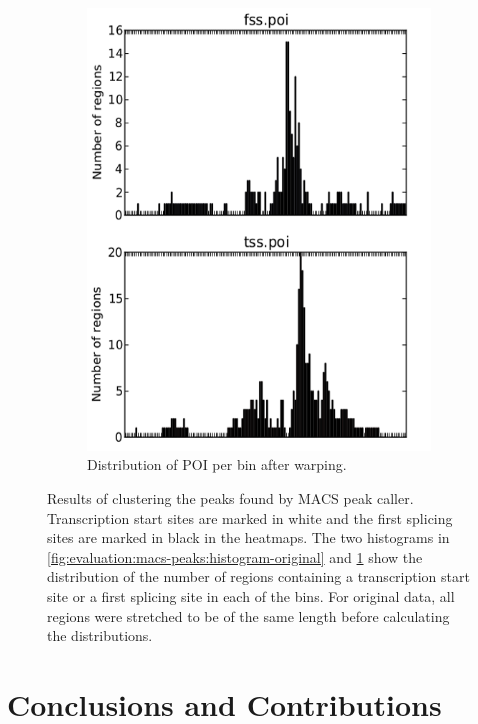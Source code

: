 \documentclass[parskip]{cs4rep}
\begin{document}
\begin{figure}
\begin{subfigure}[b]{0.45\textwidth}
        \includegraphics[width=\textwidth]{figures/evaluation/macs-peaks/cluster-35-warped-histogram-clean.png}
        \caption{Distribution of POI per bin after warping.}
        \label{fig:evaluation:macs-peaks:histogram-warped}
    \end{subfigure}
    \caption{Results of clustering the peaks found by MACS peak caller. Transcription start sites are marked in white and the first splicing sites are marked in black in the heatmaps. The two histograms in \ref{fig:evaluation:macs-peaks:histogram-original} and \ref{fig:evaluation:macs-peaks:histogram-warped} show the distribution of the number of regions containing a transcription start site or a first splicing site in each of the bins. For original data, all regions were stretched to be of the same length before calculating the distributions.}
    \label{fig:evaluation:macs-peaks}

    
    
\end{figure}





\chapter{Conclusions and Contributions}




\appendix
{}
\end{document}
